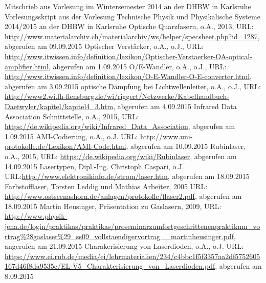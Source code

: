 \begin{thebibliography}{9999}
Mitschrieb aus Vorlesung im Wintersemester 2014 an der DHBW in Karlsruhe
Vorlesungsskript aus der Vorlesung Technische Physik und Physikalische Systeme 2014/2015 an der DHBW in Karlsruhe  
Optische Quarzfasern, o.A., 2013, URL: \url{http://www.materialarchiv.ch/materialarchiv/ws/helper/specsheet.php?id=1287}, abgerufen am 09.09.2015
Optischer Verstärker, o.A., o.J., URL: \url{http://www.itwissen.info/definition/lexikon/Optischer-Verstaerker-OA-optical-amplifier.html}, abgerufen am 1.09.2015
O/E-Wandler, o.A., o.J., URL: \url{http://www.itwissen.info/definition/lexikon/O-E-Wandler-O-E-converter.html}, abgerufen am 3.09.2015
optische Dämpfung bei Lichtwellenleiter, o.A., o.J., URL: \url{http://www2.wi.fh-flensburg.de/wi/riggert/Netzwerke/Kabelhandbuch-Daetwyler/kapitel/kapitel4_3.htm}, abgerufen am 4.09.2015
Infrared Data Association Schnittstelle, o.A., 2015, URL: \url{https://de.wikipedia.org/wiki/Infrared_Data_Association}, abgerufen am 1.09.2015
AMI-Codierung, o.A., o.J. URL: \url{http://www.uni-protokolle.de/Lexikon/AMI-Code.html}, abgerufen am 10.09.2015
Rubinlaser, o.A., 2015, URL: \url{https://de.wikipedia.org/wiki/Rubinlaser}, abgerufen am 14.09.2015
Lasertypen, Dipl.-Ing. Christoph Caspari, o.J. URL:\url{http://www.elektronikinfo.de/strom/laser.htm}, abgerufen am 18.09.2015
Farbstofflaser, Torsten Leddig und Mathias Arbeiter, 2005 URL: \url{http://www.ostseenashorn.de/anlagen/protokolle/flaser2.pdf}, abgerufen am 18.09.2015
Martin Heusinger, Präsentation zu Gaslasern, 2009, URL: \url{http://www.physik-jena.de/login/praktikas/praktikas/proseminarzumfortgeschrittenenpraktikum_vortrag\%28gaslaser\%29_ss09_vollstaendigervortrag__martinheusinger.pdf}, angerufen am 21.09.2015
Charakerisierung von Laserdioden, o.A., o.J. URL: \url{https://www.ei.rub.de/media/ei/lehrmaterialien/234/c4bbc1f5f3357aa2df5752605167d46f8da9535c/EL-V5_Charakterisierung_von_Laserdioden.pdf}, abgerufen am 8.09.2015

\end{thebibliography}
